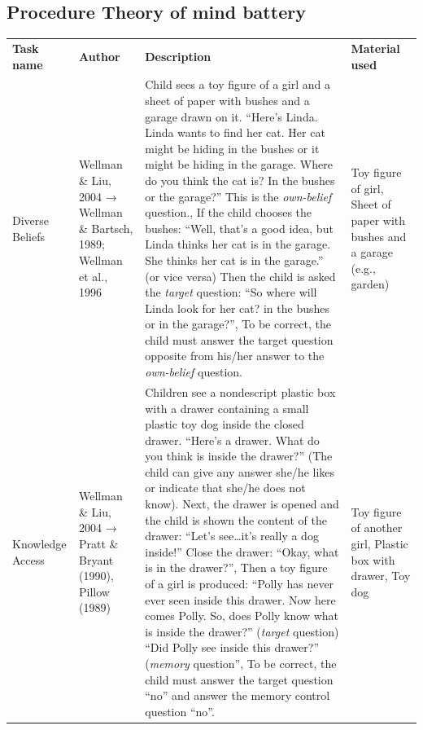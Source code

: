 \documentclass[
  man,floatsintext]{apa7}
\begin{document}
\hypertarget{procedure-theory-of-mind-battery}{%
\subsection{Procedure Theory of mind battery}\label{procedure-theory-of-mind-battery}}

\begin{longtable}[]{@{}
  >{\raggedright\arraybackslash}p{}
  >{\raggedright\arraybackslash}p{}
  >{\raggedright\arraybackslash}p{}
  >{\raggedright\arraybackslash}p{}@{}}
\toprule\noalign{}
\endhead
\bottomrule\noalign{}
\endlastfoot
\textbf{Task name} & \textbf{Author} & \textbf{Description} & \textbf{Material used} \\
Diverse Beliefs & Wellman \& Liu, 2004 → Wellman \& Bartsch, 1989; Wellman et al., 1996 & Child sees a toy figure of a girl and a sheet of paper with bushes and a garage drawn on it. ``Here's Linda. Linda wants to find her cat. Her cat might be hiding in the bushes or it might be hiding in the garage. Where do you think the cat is? In the bushes or the garage?'' This is the \emph{own-belief} question., If the child chooses the bushes: ``Well, that's a good idea, but Linda thinks her cat is in the garage. She thinks her cat is in the garage.'' (or vice versa) Then the child is asked the \emph{target} question: ``So where will Linda look for her cat? in the bushes or in the garage?'', To be correct, the child must answer the target question opposite from his/her answer to the \emph{own-belief} question. & Toy figure of girl, Sheet of paper with bushes and a garage (e.g., garden) \\
Knowledge Access & Wellman \& Liu, 2004 → Pratt \& Bryant (1990), Pillow (1989) & Children see a nondescript plastic box with a drawer containing a small plastic toy dog inside the closed drawer. ``Here's a drawer. What do you think is inside the drawer?'' (The child can give any answer she/he likes or indicate that she/he does not know). Next, the drawer is opened and the child is shown the content of the drawer: ``Let's see\ldots it's really a dog inside!'' Close the drawer: ``Okay, what is in the drawer?'', Then a toy figure of a girl is produced: ``Polly has never ever seen inside this drawer. Now here comes Polly. So, does Polly know what is inside the drawer?'' (\emph{target} question) ``Did Polly see inside this drawer?'' (\emph{memory} question'', To be correct, the child must answer the target question ``no'' and answer the memory control question ``no''. & Toy figure of another girl, Plastic box with drawer, Toy dog \\

\end{longtable}
\end{document}
